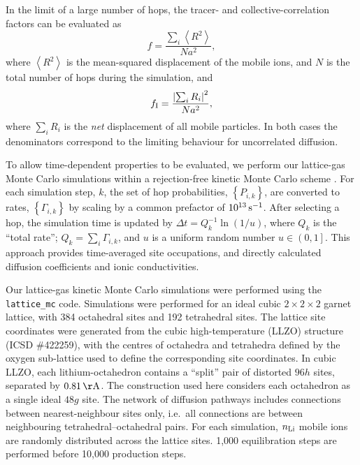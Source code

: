 \documentclass[aps,prb,twocolumn,superscriptaddress,reprint]{revtex4-1}
\newcommand{\set}[1]{\left\{#1\right\}}
\begin{document}
In the limit of a large number of hops, the tracer- and collective-correlation factors can be evaluated as
\begin{equation}
  f = \frac{\sum_i\left<R^2\right>}{Na^2},
  \label{eqn:tracer_correlation_factor}
\end{equation}
where $\left<R^2\right>$ is the mean-squared displacement of the mobile ions, and $N$ is the total number of hops during the simulation, and
\begin{equation}
  f_{\mathrm{I}} = \frac{\left|\sum_i R_i\right|^2}{Na^2},
  \label{eqn:collective_correlation_factor}
\end{equation}
where $\sum_i R_i$ is the \emph{net} displacement of all mobile particles. 
In both cases the denominators correspond to the limiting behaviour for uncorrelated diffusion.

To allow time-dependent properties to be evaluated, we perform our lattice-gas Monte Carlo simulations within a rejection-free kinetic Monte Carlo scheme \cite{Voter_RadiationEffectsInSolids2007}. 
For each simulation step, $k$, the set of hop probabilities, $\set{P_{i,k}}$, are converted to rates, $\set{\Gamma_{i,k}}$ by scaling by a common prefactor of $10^{13}\,\mathrm{s}^{-1}$. 
After selecting a hop, the simulation time is updated by $\Delta t = Q_k^{-1}\ln\left(1/u\right)$, where $Q_k$ is the ``total rate''; $Q_k=\sum_i \Gamma_{i,k}$, and $u$ is a uniform random number $u\in\left(0,1\right]$. 
This approach provides time-averaged site occupations, and directly calculated diffusion coefficients and ionic conductivities.

Our lattice-gas kinetic Monte Carlo simulations were performed using the \texttt{lattice\_mc} code.\cite{Morgan_JOSS2017} 
Simulations were performed for an ideal cubic $2\times2\times2$ garnet lattice, with 384 octahedral sites and 192 tetrahedral sites. 
The lattice site coordinates were generated from the cubic high-temperature  (LLZO) structure (ICSD \#422259),\cite{AwakaEtAl_ChemLett2011} with the centres of octahedra and tetrahedra defined by the oxygen sub-lattice used to define the corresponding site coordinates. 
In cubic LLZO, each lithium-octahedron contains a ``split'' pair of distorted $96h$ sites, separated by $0.81\u{\AA}$. 
The construction used here considers each octahedron as a single ideal $48g$ site. 
The network of diffusion pathways includes connections between nearest-neighbour sites only, i.e.\ all connections are between neighbouring tetrahedral--octahedral pairs.  For each simulation, $n_{\mathrm{Li}}$ mobile ions are randomly distributed across the lattice sites. 1,000 equilibration steps are performed before 10,000 production steps. 
\end{document}
